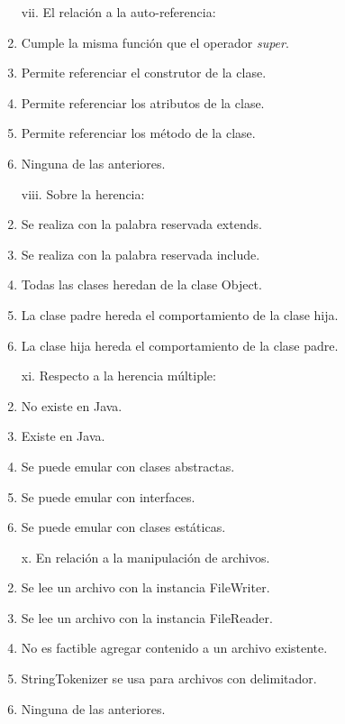 \documentclass[10pt]{article}
\begin{document}
{\begin{enumerate}
\begin{multicols}{2}
			\begin{enumerate}[label=(\alph*)]
				\item[vii.] El relaci\'on a la auto-referencia:
				\item Cumple la misma funci\'on que el operador \emph{super}.
				\item Permite referenciar el construtor de la clase.
				\item Permite referenciar los atributos de la clase.
				\item Permite referenciar los m\'etodo de la clase.
				\item Ninguna de las anteriores.
			\end{enumerate}

			\begin{enumerate}[label=(\alph*)]
				\item[viii.] Sobre la herencia:
				\item Se realiza con la palabra reservada extends.
				\item Se realiza con la palabra reservada include.
				\item Todas las clases heredan de la clase Object.
				\item La clase padre hereda el comportamiento de la clase hija.
				\item La clase hija hereda el comportamiento de la clase padre.
			\end{enumerate}

			\begin{enumerate}[label=(\alph*)]
				\item[xi.] Respecto a la herencia m\'ultiple:
				\item No existe en Java.
				\item Existe en Java.
				\item Se puede emular con clases abstractas.
				\item Se puede emular con interfaces.
				\item Se puede emular con clases est\'aticas.
			\end{enumerate}

			\begin{enumerate}[label=(\alph*)]
				\item[x.] En relaci\'on a la manipulaci\'on de archivos.
				\item Se lee un archivo con la instancia FileWriter.
				\item Se lee un archivo con la instancia FileReader.
				\item No es factible agregar contenido a un archivo existente.
				\item StringTokenizer se usa para archivos con delimitador.
				\item Ninguna de las anteriores.
			\end{enumerate}
		

\end{multicols}
\end{enumerate}}
\end{document}
